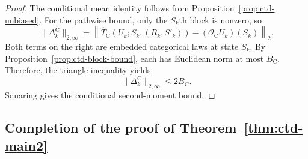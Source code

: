 \documentclass{article}
\begin{document}
\begin{proof}
The conditional mean identity follows from Proposition~\ref{prop:ctd-unbiased}. For the pathwise bound, only the $S_k$th block is nonzero, so
\begin{equation}
\lVert \Delta_k^{\mathrm C} \rVert_{2,\infty} = \left\lVert \widehat T_{\mathrm C}(U_k;S_k,(R_k,S'_k)) - (\mathcal O_{\mathrm C}U_k)(S_k) \right\rVert_2.
\end{equation}
Both terms on the right are embedded categorical laws at state $S_k$. By Proposition~\ref{prop:ctd-block-bound}, each has Euclidean norm at most $B_{\mathrm C}$. Therefore, the triangle inequality yields
\begin{equation}
\lVert \Delta_k^{\mathrm C} \rVert_{2,\infty} \le 2B_{\mathrm C}.
\end{equation}
Squaring gives the conditional second-moment bound.
\end{proof}

\subsection{Completion of the proof of Theorem~\ref{thm:ctd-main2}}
\end{document}
